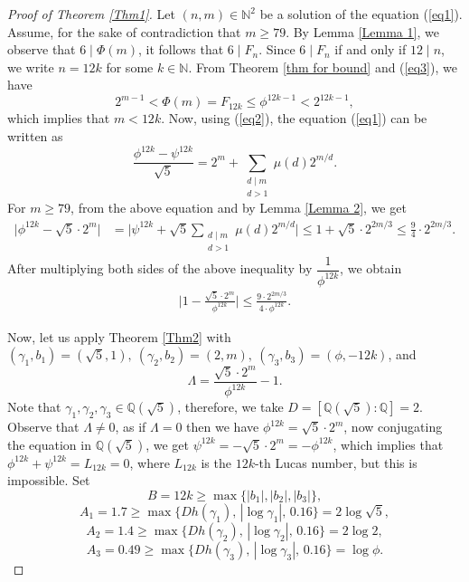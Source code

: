 \documentclass[12pt,reqno]{amsart}
\begin{document}
\begin{proof}[Proof of Theorem \ref{Thm1}]
Let $(n,m)\in \mathbb{N}^2$ be a solution of the equation (\ref{eq1}).
Assume, for the sake of contradiction that $m\geq79$. By Lemma \ref{Lemma 1}, we observe that $6\mid \Phi(m)$, it follows that $6\mid F_n$. Since $6\mid F_n$ if and only if $12\mid n$, we write $n=12k$ for some $k\in \mathbb{N}$.
From Theorem \ref{thm for bound} and (\ref{eq3}), we have 
$$2^{m-1}<\Phi(m)=F_{12k}\leq \phi^{12k-1}<2^{12k-1},$$ 
which implies that $m<12k$. Now, using (\ref{eq2}), the equation (\ref{eq1}) can be written as
$$\frac{\phi^{12k}-\psi^{12k}}{\sqrt{5}}=2^m+\sum_{\substack{d \mid m\\d>1}} \mu(d) 2^{m/d}.$$
For $m\geq79$, from the above equation and by Lemma \ref{Lemma 2}, we get
\begin{align*}
\bigg|\phi^{12k}-\sqrt{5}\cdot2^m\bigg|&=\bigg|\psi^{12k}+\sqrt{5}\sum_{\substack{d \mid m\\d>1}} \mu(d) 2^{m/d}\bigg|\leq 1+\sqrt{5}\cdot 2^{2m/3}\leq \frac{9}{4}\cdot 2^{2m/3}.
\end{align*}
After multiplying both sides of the above inequality by $\dfrac{1}{\phi^{12k}}$, we obtain
\begin{align*}\label{eq4}
    \bigg|1-\frac{\sqrt{5}\cdot 2^m}{\phi^{12k}}\bigg|\leq \frac{9\cdot 2^{2m/3}}{4\cdot\phi^{12k}}.\tag{4}
\end{align*}

Now, let us apply Theorem \ref{Thm2} with $(\gamma _{1},b_1)=(\sqrt{5},1),~(\gamma _{2},b_2)=(2 ,m),~(\gamma_{3},b_3)=(\phi,-12k)$, and 
$$\Lambda = \frac{\sqrt{5}\cdot 2^m}{\phi^{12k}} - 1.$$
Note that $\gamma_1,\gamma_2,\gamma_3\in \mathbb{Q}(\sqrt{5})$, therefore, we take $D=[\mathbb{Q}(\sqrt5):\mathbb{Q}]=2$.
Observe that $\Lambda\neq0$, as if $\Lambda=0$ then we have $\phi^{12k}=\sqrt{5}\cdot 2^m$, now conjugating the equation in $\mathbb{Q}(\sqrt{5})$, we get $\psi^{12k}=-\sqrt{5}\cdot 2^m=-\phi^{12k}$, which implies that $\phi^{12k}+\psi^{12k}=L_{12k}=0$, where $L_{12k}$ is the $12k$-th Lucas number, but this is impossible. Set
$$B=12k\geq\max\{|b_1|,|b_2|,|b_3|\},$$
$$ A_1=1.7\geq \max\{D h(\gamma_1),\,|\log \gamma_1|,\,0.16\}=2\log\sqrt{5},$$
$$A_2=1.4\geq \max\{D h(\gamma_2),\,|\log \gamma_2|,\,0.16\}=2\log2,$$
$$A_3=0.49\geq \max\{D h(\gamma_3),\,|\log \gamma_3|,\,0.16\}=\log \phi.$$


\end{proof}
\end{document}
